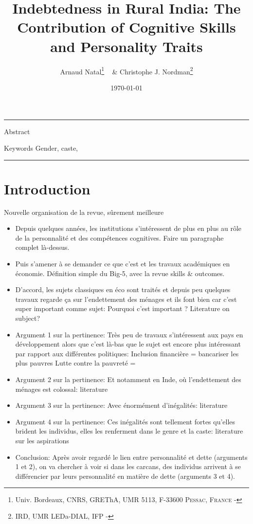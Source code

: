 \documentclass[a4paper, 11pt, onecolumn]{article}
\title{Indebtedness in Rural India: The Contribution of Cognitive Skills and Personality Traits}
\author{Arnaud Natal\thanks{Univ. Bordeaux, CNRS, GREThA, UMR 5113, F-33600 \textsc{Pessac, France} - \email{arnaud.natal@u-bordeaux.fr}} ~ \& Christophe J. Nordman\thanks{IRD, UMR LEDa-DIAL, IFP - \email{nordman@dial.prd}} }
\date{\today}
\begin{document}
\maketitle

\hrule 
\vspace{0.3cm}

\begin{resab}{Abstract}

\end{resab}

\begin{motkey}{Keywords}
Gender, caste, 
\end{motkey}


\hrule

\section{Introduction}
\label{Introduction}

Nouvelle organisation de la revue, sûrement meilleure
\begin{itemize}
\item Depuis quelques années, les institutions s'intéressent de plus en plus au rôle de la personnalité et des compétences cognitives.
Faire un paragraphe complet là-dessus.
\item Puis s'amener à se demander ce que c'est et les travaux académiques en économie.
Définition simple du Big-5, avec la revue skills \& outcomes.
\item D'accord, les sujets classiques en éco sont traités et depuis peu quelques travaux regarde ça sur l'endettement des ménages et ils font bien car c'est super important comme sujet: 
Pourquoi c'est important ? 
Literature on subject?
\item Argument 1 sur la pertinence: Très peu de travaux s'intéressent aux pays en développement alors que c'est là-bas que le sujet est encore plus intéressant par rapport aux différentes politiques:
Inclusion financière = bancariser les plus pauvres 
Lutte contre la pauvreté = 
\item Argument 2 sur la pertinence: Et notamment en Inde, où l'endettement des ménages est colossal:
literature
\item Argument 3 sur la pertinence: Avec énormément d'inégalités:
literature
\item Argument 4 sur la pertinence: Ces inégalités sont tellement fortes qu'elles brident les individus, elles les renferment dans le genre et la caste:
literature sur les aspirations
\item Conclusion:
Après avoir regardé le lien entre personnalité et dette (arguments 1 et 2), on va chercher à voir si dans les carcans, des individus arrivent à se différencier par leurs personnalité en matière de dette (arguments 3 et 4). 

\end{itemize}
\end{document}
